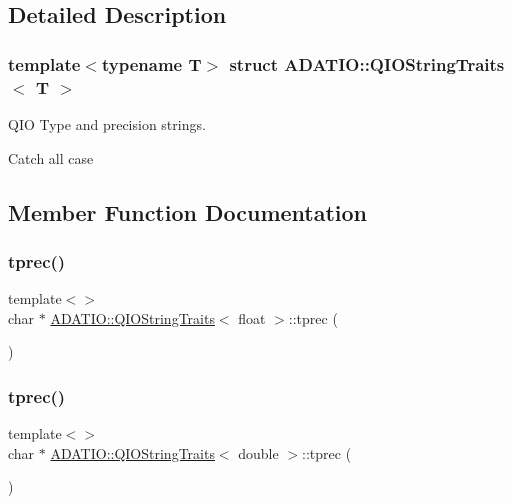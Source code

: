 \subsection{Detailed Description}
\subsubsection*{template$<$typename T$>$\newline
struct A\+D\+A\+T\+I\+O\+::\+Q\+I\+O\+String\+Traits$<$ T $>$}

Q\+IO Type and precision strings. 

Catch all case 

\subsection{Member Function Documentation}
\mbox{\label{structADATIO_1_1QIOStringTraits_ad88615f93dbc104e55a88d6d166c86dc}} 
\subsubsection{\texorpdfstring{tprec()}{tprec()}\hspace{0.1cm}{\footnotesize\ttfamily [1/3]}}
{\footnotesize\ttfamily template$<$$>$ \\
char $\ast$ \mbox{\hyperlink{structADATIO_1_1QIOStringTraits}{A\+D\+A\+T\+I\+O\+::\+Q\+I\+O\+String\+Traits}}$<$ float $>$\+::tprec (\begin{DoxyParamCaption}{ }\end{DoxyParamCaption})}

\mbox{\label{structADATIO_1_1QIOStringTraits_a749439e4e624293716faa242eb63bc7c}} 
\subsubsection{\texorpdfstring{tprec()}{tprec()}\hspace{0.1cm}{\footnotesize\ttfamily [2/3]}}
{\footnotesize\ttfamily template$<$$>$ \\
char $\ast$ \mbox{\hyperlink{structADATIO_1_1QIOStringTraits}{A\+D\+A\+T\+I\+O\+::\+Q\+I\+O\+String\+Traits}}$<$ double $>$\+::tprec (\begin{DoxyParamCaption}{ }\end{DoxyParamCaption})}

